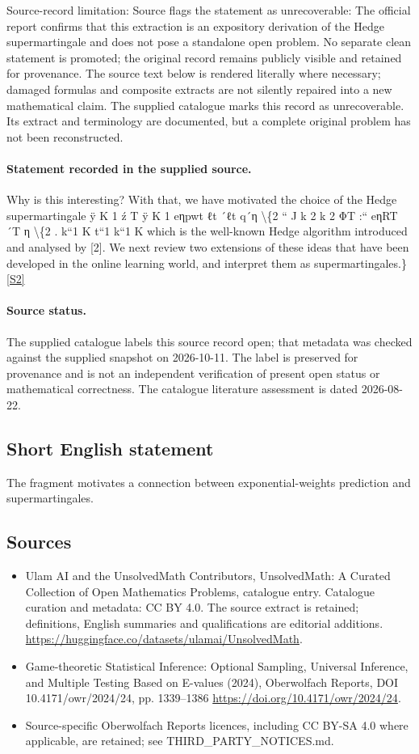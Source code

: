 \documentclass[11pt]{article}
\begin{document}
Source-record limitation: Source flags the statement as unrecoverable: The official report confirms that this extraction is an expository derivation of the Hedge supermartingale and does not pose a standalone open problem. No separate clean statement is promoted; the original record remains publicly visible and retained for provenance.
The source text below is rendered literally where necessary; damaged formulas and composite extracts are not silently repaired into a new mathematical claim.
The supplied catalogue marks this record as unrecoverable. Its extract and terminology are documented, but a complete original problem has not been reconstructed.
\paragraph{Statement recorded in the supplied source.}
Why is this interesting? With that, we have motivated the choice of the Hedge supermartingale ÿ K 1 ź T ÿ K 1 eηpwt ℓt ´ℓt q´η \textbackslash{}\{2 “ J k 2 k 2 ΦT :“ eηRT ´T η \textbackslash{}\{2 . k“1 K t“1 k“1 K which is the well-known Hedge algorithm introduced and analysed by [2]. We next review two extensions of these ideas that have been developed in the online learning world, and interpret them as supermartingales.\} \href{https://doi.org/10.4171/owr/2024/24}{[S2]}
\paragraph{Source status.}
The supplied catalogue labels this source record open; that metadata was checked against the supplied snapshot on 2026-10-11. The label is preserved for provenance and is not an independent verification of present open status or mathematical correctness. The catalogue literature assessment is dated 2026-08-22.
\subsection{Short English statement}
The fragment motivates a connection between exponential-weights prediction and supermartingales.
\subsection{Sources}
\begin{itemize}
\item[S1] Ulam AI and the UnsolvedMath Contributors, UnsolvedMath: A Curated Collection of Open Mathematics Problems, catalogue entry. Catalogue curation and metadata: CC BY 4.0. The source extract is retained; definitions, English summaries and qualifications are editorial additions.
\url{https://huggingface.co/datasets/ulamai/UnsolvedMath}.
\item[S2] Game-theoretic Statistical Inference: Optional Sampling, Universal Inference, and Multiple Testing Based on E-values (2024), Oberwolfach Reports, DOI 10.4171/owr/2024/24, pp. 1339--1386
\url{https://doi.org/10.4171/owr/2024/24}.
\item Source-specific Oberwolfach Reports licences, including CC BY-SA 4.0 where applicable, are retained; see THIRD\_PARTY\_NOTICES.md.
\end{itemize}
\end{document}
